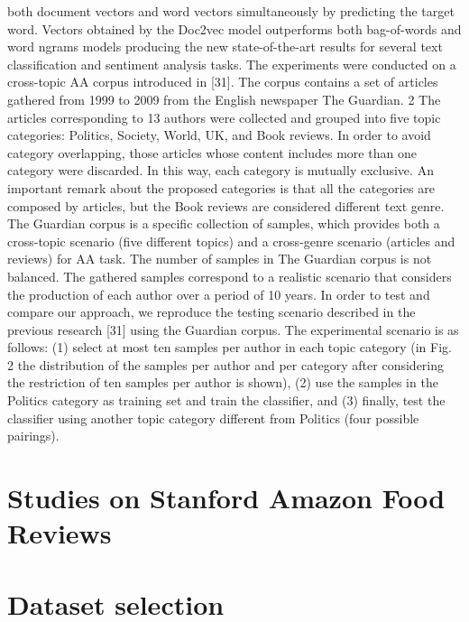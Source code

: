 both document vectors and word vectors simultaneously by predicting the target word.
Vectors obtained by the Doc2vec model outperforms both bag-of-words and word ngrams models producing the new state-of-the-art results for several text classification
and sentiment analysis tasks.
The experiments were conducted on a cross-topic AA corpus introduced in [31].
The corpus contains a set of articles gathered from 1999 to 2009 from the English
newspaper The Guardian.
2 The articles corresponding to 13 authors were collected
and grouped into five topic categories: Politics, Society, World, UK, and Book reviews.
In order to avoid category overlapping, those articles whose content includes more
than one category were discarded. In this way, each category is mutually exclusive. An
important remark about the proposed categories is that all the categories are composed
by articles, but the Book reviews are considered different text genre. The Guardian
corpus is a specific collection of samples, which provides both a cross-topic scenario
(five different topics) and a cross-genre scenario (articles and reviews) for AA task.
The number of samples in The Guardian corpus is not balanced. The gathered
samples correspond to a realistic scenario that considers the production of each author
over a period of 10 years.
In order to test and compare our approach, we reproduce the testing scenario
described in the previous research [31] using the Guardian corpus. The experimental
scenario is as follows: (1) select at most ten samples per author in each topic category
(in Fig. 2 the distribution of the samples per author and per category after considering
the restriction of ten samples per author is shown), (2) use the samples in the Politics category as training set and train the classifier, and (3) finally, test the classifier using
another topic category different from Politics (four possible pairings).

\section{Studies on Stanford Amazon Food Reviews}

\section{Dataset selection}